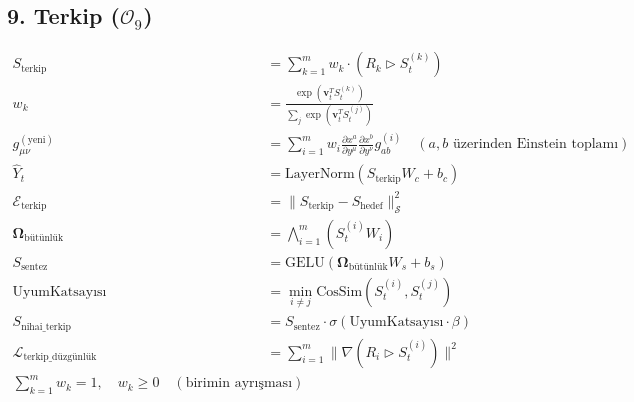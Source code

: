 \documentclass[11pt, a4paper]{article}
\begin{document}
\subsection{9. Terkip ($\mathcal{O}_9$)}
\begin{align}
S_{\text{terkip}} &= \sum_{k=1}^m w_k \cdot \left( R_k \triangleright S_t^{(k)} \right) \\
w_k &= \frac{\exp(\mathbf{v}_t^T S_t^{(k)})}{\sum_j \exp(\mathbf{v}_t^T S_t^{(j)})} \\
g_{\mu\nu}^{(\text{yeni})} &= \sum_{i=1}^m w_i \frac{\partial x^a}{\partial y^\mu} \frac{\partial x^b}{\partial y^\nu} g_{ab}^{(i)} \quad (a, b \text{ üzerinden Einstein toplamı}) \\
\hat{Y}_t &= \text{LayerNorm}(S_{\text{terkip}} W_c + b_c) \\
\mathcal{E}_{\text{terkip}} &= \| S_{\text{terkip}} - S_{\text{hedef}} \|_{\mathcal{S}}^2 \\
\mathbf{\Omega}_{\text{bütünlük}} &= \bigwedge_{i=1}^m (S_t^{(i)} W_i) \\
S_{\text{sentez}} &= \text{GELU}\left( \mathbf{\Omega}_{\text{bütünlük}} W_s + b_s \right) \\
\text{UyumKatsayısı} &= \min_{i \neq j} \text{CosSim}(S_t^{(i)}, S_t^{(j)}) \\
S_{\text{nihai\_terkip}} &= S_{\text{sentez}} \cdot \sigma(\text{UyumKatsayısı} \cdot \beta) \\
\mathcal{L}_{\text{terkip\_düzgünlük}} &= \sum_{i=1}^m \| \nabla (R_i \triangleright S_t^{(i)}) \|^2 \\
\sum_{k=1}^m w_k = 1, \quad w_k \ge 0 \quad (\text{birimin ayrışması})
\end{align}
\end{document}
